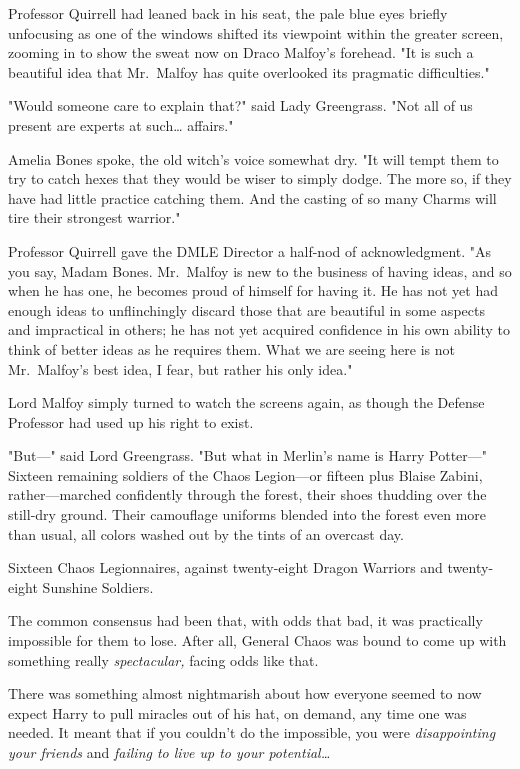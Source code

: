 Professor Quirrell had leaned back in his seat, the pale blue eyes briefly 
unfocusing as one of the windows shifted its viewpoint within the greater 
screen, zooming in to show the sweat now on Draco Malfoy's forehead. "It is 
such a beautiful idea that Mr.~Malfoy has quite overlooked its pragmatic 
difficulties."

"Would someone care to explain that?" said Lady Greengrass. "Not all of us 
present are experts at such{\ldots} affairs."

Amelia Bones spoke, the old witch's voice somewhat dry. "It will tempt them to 
try to catch hexes that they would be wiser to simply dodge. The more so, if 
they have had little practice catching them. And the casting of so many Charms 
will tire their strongest warrior."

Professor Quirrell gave the DMLE Director a half-nod of acknowledgment. "As you 
say, Madam Bones. Mr.~Malfoy is new to the business of having ideas, and so 
when he has one, he becomes proud of himself for having it. He has not yet had 
enough ideas to unflinchingly discard those that are beautiful in some aspects 
and impractical in others; he has not yet acquired confidence in his own 
ability to think of better ideas as he requires them. What we are seeing here 
is not Mr.~Malfoy's best idea, I fear, but rather his only idea."

Lord Malfoy simply turned to watch the screens again, as though the Defense 
Professor had used up his right to exist.

"But---" said Lord Greengrass. "But what in Merlin's name is Harry Potter---"
\sbreak
Sixteen remaining soldiers of the Chaos Legion---or fifteen plus Blaise Zabini, 
rather---marched confidently through the forest, their shoes thudding over the 
still-dry ground. Their camouflage uniforms blended into the forest even more 
than usual, all colors washed out by the tints of an overcast day.

Sixteen Chaos Legionnaires, against twenty-eight Dragon Warriors and 
twenty-eight Sunshine Soldiers.

The common consensus had been that, with odds that bad, it was practically 
impossible for them to lose. After all, General Chaos was bound to come up with 
something really \emph{spectacular,} facing odds like that.

There was something almost nightmarish about how everyone seemed to now expect 
Harry to pull miracles out of his hat, on demand, any time one was needed. It 
meant that if you couldn't do the impossible, you were \emph{disappointing your 
friends} and \emph{failing to live up to your potential{\ldots}}


